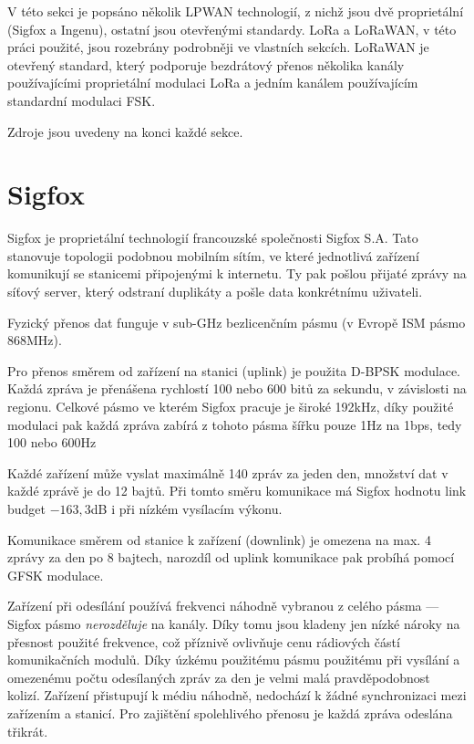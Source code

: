 V této sekci je popsáno několik LPWAN technologií, z nichž jsou dvě 
proprietální (Sigfox a Ingenu), ostatní jsou otevřenými standardy. LoRa a 
LoRaWAN, v této práci použité, jsou rozebrány podrobněji ve vlastních sekcích. 
LoRaWAN je otevřený standard, který podporuje bezdrátový přenos několika kanály
používajícími proprietální modulaci LoRa a jedním kanálem používajícím 
standardní modulaci FSK.

Zdroje jsou uvedeny na konci každé sekce.

\section{Sigfox}

Sigfox je proprietální technologií francouzské společnosti Sigfox S.A. Tato 
stanovuje topologii podobnou mobilním sítím, ve které jednotlivá zařízení 
komunikují se stanicemi připojenými k internetu. Ty pak pošlou přijaté zprávy 
na síťový server, který odstraní duplikáty a pošle data konkrétnímu 
uživateli.

Fyzický přenos dat funguje v sub-GHz bezlicenčním pásmu (v Evropě ISM pásmo 
868MHz).

Pro přenos směrem od zařízení na stanici (uplink) je použita D-BPSK modulace. 
Každá zpráva je přenášena rychlostí 100 nebo 600 bitů za sekundu, v závislosti 
na regionu. Celkové pásmo ve kterém Sigfox pracuje je široké 192kHz, díky 
použité modulaci pak každá zpráva zabírá z tohoto pásma šířku pouze 1Hz na 1bps, 
tedy 100 nebo 600Hz

Každé zařízení může vyslat maximálně 140 zpráv za jeden den, množství dat v 
každé zprávě je do 12 bajtů. Při tomto směru komunikace má Sigfox hodnotu link 
budget $-163,3$dB i při nízkém vysílacím výkonu.

Komunikace směrem od stanice k zařízení (downlink) je omezena na max. 4 zprávy 
za den po 8 bajtech, narozdíl od uplink komunikace pak probíhá pomocí GFSK 
modulace.

Zařízení při odesílání používá frekvenci náhodně vybranou z celého pásma --- 
Sigfox pásmo \emph{nerozděluje} na kanály. Díky tomu jsou kladeny jen nízké 
nároky na přesnost použité frekvence, což příznivě ovlivňuje cenu rádiových částí komunikačních
modulů. Díky úzkému použitému pásmu použitému při vysílání a omezenému počtu 
odesílaných zpráv za den je velmi malá pravděpodobnost kolizí. Zařízení 
přistupují k médiu náhodně, nedochází k žádné synchronizaci mezi zařízením a 
stanicí. Pro zajištění spolehlivého přenosu je každá zpráva odeslána třikrát.

